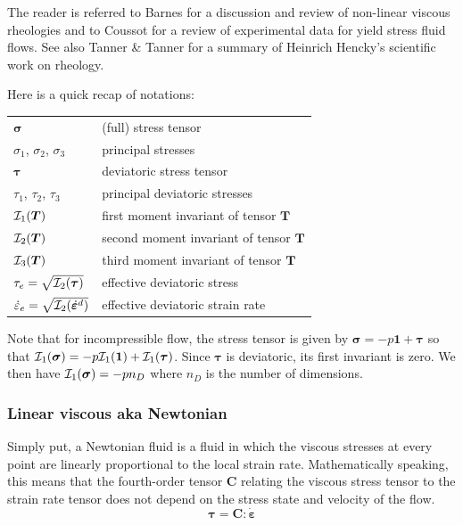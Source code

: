 

The reader is referred to Barnes \cite{barn99}
for a discussion and review of non-linear viscous rheologies and 
to Coussot \cite{cous14} for a review of experimental data for yield stress fluid
flows. See also Tanner \& Tanner \cite{tata03} for a summary of Heinrich Hencky's 
scientific work on rheology. 

Here is a quick recap of notations:

\begin{center}
\begin{tabular}{ll}
\hline
${\bm \sigma}$ & (full) stress tensor \\
$\sigma_1$, $\sigma_2$, $\sigma_3$ & principal stresses \\ 
${\bm \tau}$   & deviatoric stress tensor \\
$\tau_1$, $\tau_2$, $\tau_3$ & principal deviatoric stresses \\ 
${\cal I}_1({\bm T})$ & first moment invariant of tensor ${\bm T}$ \\
${\cal I}_2({\bm T})$ & second moment invariant of tensor ${\bm T}$ \\
${\cal I}_3({\bm T})$ & third moment invariant of tensor ${\bm T}$ \\
${\tau}_{e}=\sqrt{{\cal I}_2({\bm \tau})}$ & effective deviatoric stress \\
$\dot{{\varepsilon}}_{e}=\sqrt{{\cal I}_2(\dot{\bm \varepsilon}^d)}$ & effective deviatoric strain rate \\
\hline
\end{tabular}
\end{center}

Note that for incompressible flow, the stress tensor is given by 
${\bm \sigma}=-p {\bm 1} + {\bm \tau}$ so that 
${\cal I}_1({\bm \sigma})=-p {\cal I}_1({\bm 1}) + {\cal I}_1({\bm \tau})$.
Since ${\bm \tau}$ is deviatoric, its first invariant is zero. We then have
${\cal I}_1({\bm \sigma})=-p n_D$ where $n_D$ is the number of dimensions.

\subsubsection{Linear viscous aka Newtonian} 

Simply put, a Newtonian fluid is a fluid in which the viscous stresses at every point are linearly proportional 
to the local strain rate.
Mathematically speaking, this means that the fourth-order tensor ${\bm C}$ relating the viscous stress 
tensor to the strain rate tensor does not depend on the stress state and velocity of the flow.
\[
{\bm \tau}={\bm C} : \dot{\bm \varepsilon}
\]

